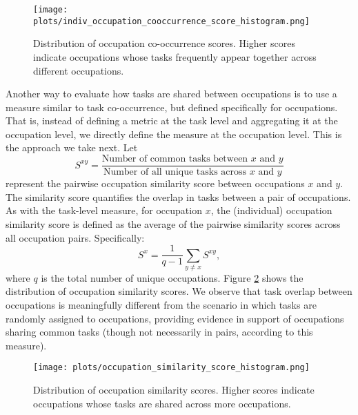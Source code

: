 \documentclass{article}
\theoremstyle{plain}
\theoremstyle{plain}
\begin{document}

\begin{figure}[htbp]
  \centering
  \texttt{[image: plots/indiv\_occupation\_cooccurrence\_score\_histogram.png]}
  \caption{Distribution of occupation co-occurrence scores. Higher scores indicate occupations whose tasks frequently appear together across different occupations.}
  \label{fig:occ_cooc}
\end{figure}

Another way to evaluate how tasks are shared between occupations is to use a measure similar to task co-occurrence, but defined specifically for occupations. 
That is, instead of defining a metric at the task level and aggregating it at the occupation level, we directly define the measure at the occupation level. 
This is the approach we take next.
Let
$$S^{xy} = \frac{\text{Number of common tasks between $x$ and $y$}}{\text{Number of all unique tasks across $x$ and $y$}}$$
represent the pairwise occupation similarity score between occupations $x$ and $y$. 
The similarity score quantifies the overlap in tasks between a pair of occupations. 
As with the task-level measure, for occupation $x$, the (individual) occupation similarity score is defined as the average of the pairwise similarity scores across all occupation pairs. 
Specifically:
$$S^{x}=\frac{1}{q-1}\sum_{y\neq x}S^{xy},$$ where $q$ is the total number of unique occupations.
Figure \ref{fig:occ_similarity} shows the distribution of occupation similarity scores. 
We observe that task overlap between occupations is meaningfully different from the scenario in which tasks are randomly assigned to occupations, providing evidence in support of occupations sharing common tasks (though not necessarily in pairs, according to this measure).

\begin{figure}[htbp]
  \centering
  \texttt{[image: plots/occupation\_similarity\_score\_histogram.png]}
  \caption{Distribution of occupation similarity scores. Higher scores indicate occupations whose tasks are shared across more occupations.}
  \label{fig:occ_similarity}
\end{figure}

\end{document}
